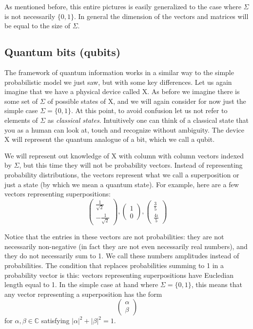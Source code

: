 As mentioned before, this entire pictures is easily generalized to the case where $\Sigma$ is not necessarily $\{0,1\}$. In general the dimension of the vectors and matrices will be equal to the size of $\Sigma$.

\subsection{Quantum bits (qubits)}
The framework of quantum information works in a similar way to the simple probabilistic model we just saw, but with some key differences. Let us again imagine that we have a physical device called X. As before we imagine there is some set of $\Sigma$ of possible states of X, and we will again consider for now just the simple case $\Sigma=\{0,1\}$. At this point, to avoid confusion let us not refer to elements of $\Sigma$ as \textit{classical states}. Intuitively one can think of a classical state that you as a human can look at, touch and recognize without ambiguity. The device X will represent the quantum analogue of a bit, which we call a qubit.

We will represent out knowledge of X with column with column vectors indexed by $\Sigma$, but this time they will not be probability vectors. Instead of representing probability distributions, the vectors represent what we call a superposition or just a state (by which we mean a quantum state). For example, here are a few vectors representing superpositions:
\[
\begin{pmatrix} \frac{1}{\sqrt{2}} \\ -\frac{1}{\sqrt{2}} \end{pmatrix}, \begin{pmatrix} 1 \\ 0 \end{pmatrix}, \begin{pmatrix} \frac{3}{5} \\ \frac{4\iota}{5} \end{pmatrix}
\]

Notice that the entries in these vectors are not probabilities: they are not necessarily non-negative (in fact they are not even necessarily real numbers), and they do not necessarily sum to 1. We call these numbers amplitudes instead of probabilities. The condition that replaces probabilities summing to 1 in a probability vector is this: vectors representing superpositions have Eucledian length equal to 1. In the simple case at hand where $\Sigma = \{0,1\}$, this means that any vector representing a superposition has the form
\[
\begin{pmatrix} \alpha \\ \beta \end{pmatrix} 
\]
for $\alpha, \beta \in \mathbb{C}$ satisfying $|\alpha|^2+|\beta|^2=1$.

